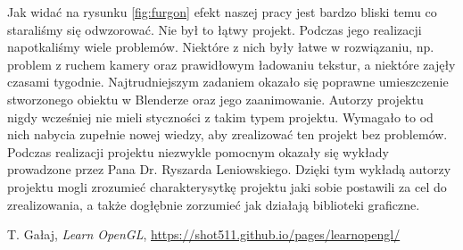 \documentclass[a4paper,12pt]{article}
\numberwithin{equation}{section}
\begin{document}
Jak widać na rysunku \ref{fig:furgon} efekt naszej pracy jest bardzo bliski temu co staraliśmy się odwzorować. Nie był to łątwy projekt. Podczas jego realizacji napotkaliśmy wiele problemów. Niektóre z nich były łatwe w rozwiązaniu, np. problem z ruchem kamery oraz prawidłowym ładowaniu tekstur, a niektóre zajęły czasami tygodnie. Najtrudniejszym zadaniem okazało się poprawne umieszczenie stworzonego obiektu w Blenderze oraz jego zaanimowanie. Autorzy projektu nigdy wcześniej nie mieli styczności z takim typem projektu. Wymagało to od nich nabycia zupełnie nowej wiedzy, aby zrealizować ten projekt bez problemów.
\newline
\indent Podczas realizacji projektu niezwykle pomocnym okazały się wykłady prowadzone przez Pana Dr. Ryszarda Leniowskiego. Dzięki tym wykładą autorzy projektu mogli zrozumieć charakterysytkę projektu jaki sobie postawili za cel do zrealizowania, a także dogłębnie zorzumieć jak działają biblioteki graficzne.



\begin{thebibliography}{9}
     T. Gałaj, \emph{Learn OpenGL}, \href{https://shot511.github.io/pages/learnopengl/}{https://shot511.github.io/pages/learnopengl/}
\end{thebibliography}
\end{document}
